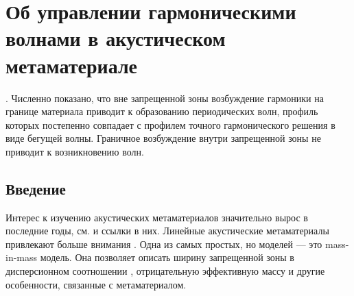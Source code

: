 \chapter{Об управлении гармоническими волнами в акустическом метаматериале}


. Численно показано, что вне запрещенной зоны возбуждение гармоники на границе материала приводит к образованию периодических волн, профиль которых постепенно совпадает с профилем точного гармонического решения в виде бегущей волны. Граничное возбуждение внутри запрещенной зоны не приводит к возникновению волн. 
  
\section{Введение}

Интерес к изучению акустических метаматериалов значительно вырос в последние годы, см. \cite{Cummer, Cvet, Huang2010, Ma, Muller, delis1, Eremeyev2020, Porubov2019, Erofeev2020} и ссылки в них. Линейные акустические метаматериалы привлекают больше внимания \cite{Cvet, Huang2010, Muller}. Одна из самых простых, но  моделей --- это mass-in-mass модель. Она позволяет описать ширину запрещенной зоны в дисперсионном соотношении \cite{Cvet, Huang2010}, отрицательную эффективную массу и другие особенности, связанные с метаматериалом. 

